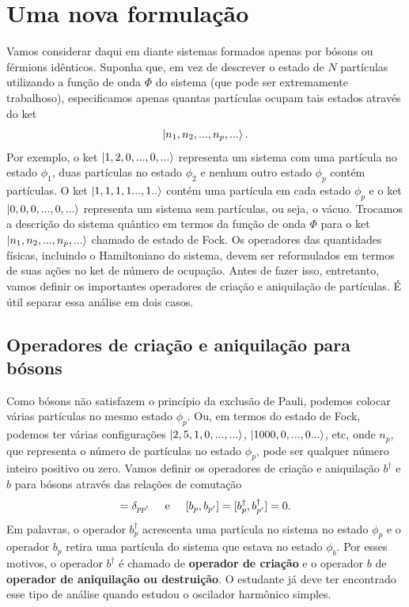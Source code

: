 \documentclass{article}
\begin{document}
\section{Uma nova formulação}

Vamos considerar daqui em diante sistemas formados apenas por bósons ou férmions idênticos. Suponha que, em vez de descrever o estado de $N$ partículas utilizando a função de onda $\Phi$ do sistema (que pode ser extremamente trabalhoso), especificamos apenas quantas partículas ocupam tais estados através do ket
\begin{equation}
    \ket{n_1,n_2,...,n_p,...}.
\end{equation}
Por exemplo, o ket $\ket{1,2,0,...,0,...}$ representa um sistema com uma partícula no estado $\phi_1$, duas partículas no estado $\phi_2$ e nenhum outro estado $\phi_p$ contém partículas. O ket $\ket{1,1,1,1...,1..}$ contém uma partícula em cada estado $\phi_p$ e o ket $\ket{0,0,0,...,0,...}$ representa um sistema sem partículas, ou seja, o vácuo. Trocamos a descrição do sistema quântico em termos da função de onda $\Phi$ para o ket $\ket{n_1,n_2,...,n_p,...}$ chamado de estado de Fock. Os operadores das quantidades físicas, incluindo o Hamiltoniano do sistema, devem ser reformulados em termos de suas ações no ket de número de ocupação. Antes de fazer isso, entretanto, vamos definir os importantes operadores de criação e aniquilação de partículas. É útil separar essa análise em dois casos.

\subsection{Operadores de criação e aniquilação para bósons}

Como bósons não satisfazem o princípio da exclusão de Pauli, podemos colocar várias partículas no mesmo estado $\phi_p$. Ou, em termos do estado de Fock, podemos ter várias configurações $\ket{2,5,1,0,...,...}$, $\ket{1000,0,...,0...}$, etc, onde $n_p$, que representa o número de partículas no estado $\phi_p$, pode ser qualquer número inteiro positivo ou zero. Vamos definir os operadores de criação e aniquilação $b^\dagger$ e $b$ para bósons através das relações de comutação
\begin{equation}
    [b_p,b^\dagger_{p'}] = \delta_{pp'} \hspace{0.5cm} \text{e} \hspace{0.5cm} [b_p,b_{p'}] = [b^\dagger_p,b^\dagger_{p'}] = 0.
    \label{eq13}
\end{equation}
Em palavras, o operador $b^\dagger_p$ acrescenta uma partícula no sistema no estado $\phi_p$ e o operador $b_p$ retira uma partícula do sistema que estava no estado $\phi_b$. Por esses motivos, o operador $b^\dagger$ é chamado de \textbf{operador de criação} e o operador $b$ de \textbf{operador de aniquilação ou destruição}. O estudante já deve ter encontrado esse tipo de análise quando estudou o oscilador harmônico simples. 
\end{document}
